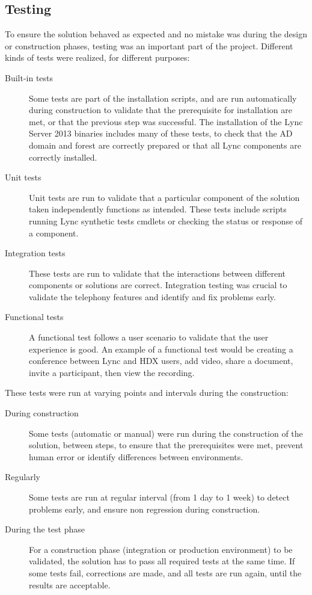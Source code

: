 \subsection{Testing}
	To ensure the solution behaved as expected and no mistake was during the design or construction phases, testing was an important part of the project. Different kinds of tests were realized, for different purposes:
	
	\begin{description}
		\item[Built-in tests] Some tests are part of the installation scripts, and are run automatically during construction to validate that the prerequisite for installation are met, or that the previous step was successful. The installation of the Lync Server 2013 binaries includes many of these tests, to check that the AD domain and forest are correctly prepared or that all Lync components are correctly installed.
		
		\item[Unit tests] Unit tests are run to validate that a particular component of the solution taken independently functions as intended. These tests include scripts running Lync synthetic tests cmdlets or checking the status or response of a component.
		 
		\item[Integration tests] These tests are run to validate that the interactions between different components or solutions are correct. Integration testing was crucial to validate the telephony features and identify and fix problems early.
		
		\item[Functional tests] A functional test follows a user scenario to validate that the user experience is good. An example of a functional test would be creating a conference between Lync and HDX users, add video, share a document, invite a participant, then view the recording.
	\end{description}

	These tests were run at varying points and intervals during the construction:
	\begin{description}
		\item[During construction] Some tests (automatic or manual) were run during the construction of the solution, between steps, to ensure that the prerequisites were met, prevent human error or identify differences between environments.
		
		\item[Regularly] Some tests are run at regular interval (from 1 day to 1 week) to detect problems early, and ensure non regression during construction.
		
		\item[During the test phase] For a construction phase (integration or production environment) to be validated, the solution has to pass all required tests at the same time. If some tests fail, corrections are made, and all tests are run again, until the results are acceptable.
	\end{description}

